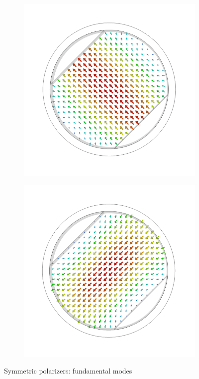 \documentclass[11pt,a4paper,twoside,openany]{report}
\begin{document}
\begin{figure}[!ht]
\begin{subfigure}{.45\textwidth}
        \includegraphics[width=.75\textwidth]{src/polarizer_circular_mode1.png}
        \caption{\label{fig:circular-polarizer-mode1}}
    \end{subfigure}
    \hspace{0.5cm}
    \begin{subfigure}{.45\textwidth}
        \centering
        \includegraphics[width=.75\textwidth]{src/polarizer_circular_mode2.png}
        \caption{\label{fig:circular-polarizer-mode2}}
    \end{subfigure}
    \caption{\label{fig:symmetric-polarizer-modes}Symmetric polarizers: fundamental modes}
\end{figure}
\end{document}
